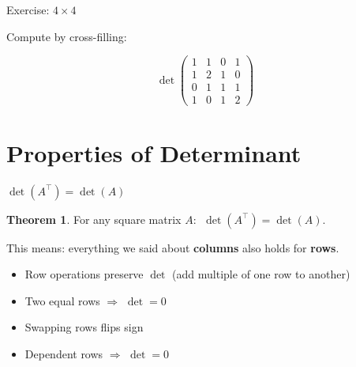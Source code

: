 \documentclass[10pt]{beamer}
\theoremstyle{definition}
\newtheorem{thm}{Theorem}[section]
\newcommand{\x}[1]{\alert{\textbf{#1}}}
\begin{document}
\begin{frame}{Exercise: $4 \times 4$}

Compute by cross-filling:

$$
\det\begin{pmatrix}
1 & 1 & 0 & 1 \\
1 & 2 & 1 & 0 \\
0 & 1 & 1 & 1 \\
1 & 0 & 1 & 2
\end{pmatrix}
$$

\end{frame}


\section{Properties of Determinant}

\begin{frame}{$\det(A^\top) = \det(A)$}

\begin{thm}
For any square matrix $A$: $\;\det(A^\top) = \det(A)$.
\end{thm}

\vfill

This means: everything we said about \x{columns} also holds for \x{rows}.

\vfill

\begin{itemize}
\item Row operations preserve $\det$ (add multiple of one row to another)
\item Two equal rows $\Rightarrow$ $\det = 0$
\item Swapping rows flips sign
\item Dependent rows $\Rightarrow$ $\det = 0$
\end{itemize}

\end{frame}
\end{document}

